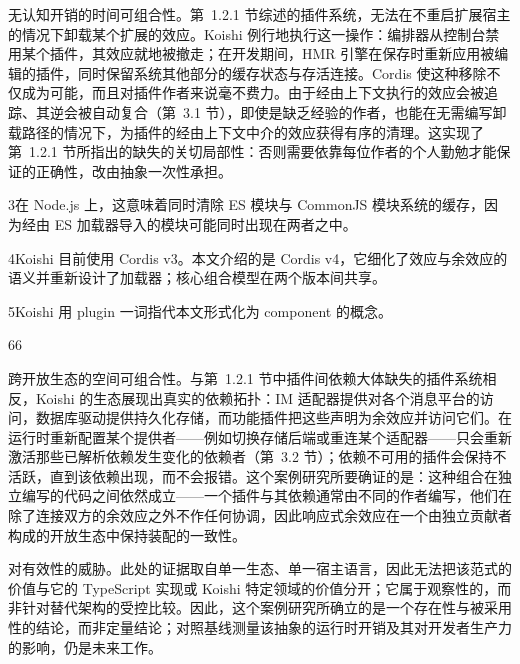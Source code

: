 无认知开销的时间可组合性。第~1.2.1 节综述的插件系统，无法在不重启扩展宿主的情况下卸载某个扩展的效应。Koishi 例行地执行这一操作：编排器从控制台禁用某个插件，其效应就地被撤走；在开发期间，HMR 引擎在保存时重新应用被编辑的插件，同时保留系统其他部分的缓存状态与存活连接。Cordis 使这种移除不仅成为可能，而且对插件作者来说毫不费力。由于经由上下文执行的效应会被追踪、其逆会被自动复合（第~3.1 节），即使是缺乏经验的作者，也能在无需编写卸载路径的情况下，为插件的经由上下文中介的效应获得有序的清理。这实现了第~1.2.1 节所指出的缺失的关切局部性：否则需要依靠每位作者的个人勤勉才能保证的正确性，改由抽象一次性承担。

3在 Node.js 上，这意味着同时清除 ES 模块与 CommonJS 模块系统的缓存，因为经由 ES 加载器导入的模块可能同时出现在两者之中。

4Koishi 目前使用 Cordis v3。本文介绍的是 Cordis v4，它细化了效应与余效应的语义并重新设计了加载器；核心组合模型在两个版本间共享。

5Koishi 用 plugin 一词指代本文形式化为 component 的概念。

66

跨开放生态的空间可组合性。与第~1.2.1 节中插件间依赖大体缺失的插件系统相反，Koishi 的生态展现出真实的依赖拓扑：IM 适配器提供对各个消息平台的访问，数据库驱动提供持久化存储，而功能插件把这些声明为余效应并访问它们。在运行时重新配置某个提供者——例如切换存储后端或重连某个适配器——只会重新激活那些已解析依赖发生变化的依赖者（第~3.2 节）；依赖不可用的插件会保持不活跃，直到该依赖出现，而不会报错。这个案例研究所要确证的是：这种组合在独立编写的代码之间依然成立——一个插件与其依赖通常由不同的作者编写，他们在除了连接双方的余效应之外不作任何协调，因此响应式余效应在一个由独立贡献者构成的开放生态中保持装配的一致性。

对有效性的威胁。此处的证据取自单一生态、单一宿主语言，因此无法把该范式的价值与它的 TypeScript 实现或 Koishi 特定领域的价值分开；它属于观察性的，而非针对替代架构的受控比较。因此，这个案例研究所确立的是一个存在性与被采用性的结论，而非定量结论；对照基线测量该抽象的运行时开销及其对开发者生产力的影响，仍是未来工作。
